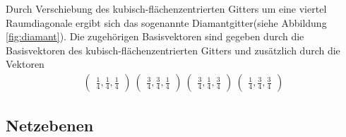 Durch Verschiebung des kubisch-flächenzentrierten Gitters
um eine viertel Raumdiagonale ergibt sich das sogenannte
Diamantgitter(siehe Abbildung \ref{fig:diamant}).
Die zugehörigen Basisvektoren sind gegeben
durch die Basisvektoren des kubisch-flächenzentrierten Gitters
und zusätzlich durch die Vektoren
\begin{align}
  \label{eqn:4}
  \begin{pmatrix}
    \frac{1}{4}, \frac{1}{4}, \frac{1}{4}
  \end{pmatrix}\
  \begin{pmatrix}
    \frac{3}{4}, \frac{3}{4}, \frac{1}{4}
  \end{pmatrix}\
  \begin{pmatrix}
    \frac{3}{4}, \frac{1}{4}, \frac{3}{4}
  \end{pmatrix}\
  \begin{pmatrix}
    \frac{1}{4}, \frac{3}{4}, \frac{3}{4}
  \end{pmatrix}
\end{align}
\subsection{Netzebenen}
\label{subsec:netzebenen}

